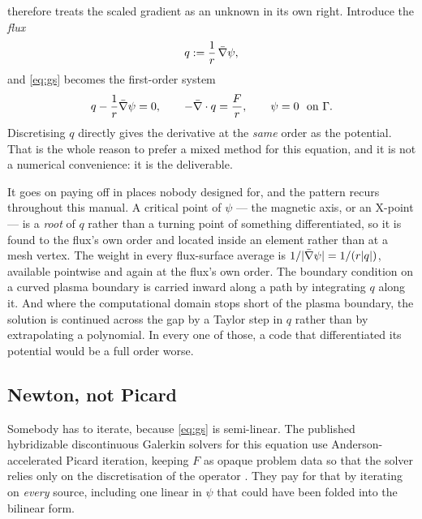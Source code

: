 {\meq} therefore treats the scaled gradient as an unknown in its own right.
Introduce the \emph{flux}
%
\begin{equation}
	q := \frac{1}{r}\, \bar{\nabla}\psi ,
	\label{eq:flux}
\end{equation}
%
and \eqref{eq:gs} becomes the first-order system
%
\begin{equation}
	q - \frac{1}{r}\bar{\nabla}\psi = 0,
	\qquad
	-\bar{\nabla}\cdot q = \frac{F}{r},
	\qquad
	\psi = 0 \ \text{ on } \Gamma .
	\label{eq:first-order}
\end{equation}
%
Discretising $q$ directly gives the derivative at the \emph{same} order as the
potential. That is the whole reason to prefer a mixed method for this equation,
and it is not a numerical convenience: it is the deliverable.

It goes on paying off in places nobody designed for, and the pattern recurs
throughout this manual. A critical point of $\psi$ --- the magnetic axis, or an
X-point --- is a \emph{root} of $q$ rather than a turning point of something
differentiated, so it is found to the flux's own order and located inside an
element rather than at a mesh vertex. The weight in every flux-surface average
is $1/|\bar{\nabla}\psi| = 1/(r|q|)$, available pointwise and again at the flux's own
order. The boundary condition on a curved plasma boundary is carried inward
along a path by integrating $q$ along it. And where the computational domain
stops short of the plasma boundary, the solution is continued across the gap by
a Taylor step in $q$ rather than by extrapolating a polynomial. In every one of
those, a code that differentiated its potential would be a full order worse.

\subsection{Newton, not Picard}

Somebody has to iterate, because \eqref{eq:gs} is semi-linear. The published
hybridizable discontinuous Galerkin solvers for this equation use
Anderson-accelerated Picard iteration, keeping $F$ as opaque problem data so
that the solver relies only on the discretisation of the operator
\cite{SanchezVizuetSolano2019}. They pay for that by iterating on \emph{every}
source, including one linear in $\psi$ that could have been folded into the
bilinear form.

